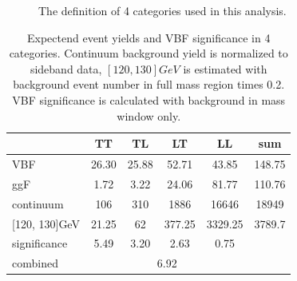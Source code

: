 \begin{figure}[htbp]
  \centering
  \hfill
  \caption{The definition of 4 categories used in this analysis. }
  \label{fig:catedef}
\end{figure}

\begin{table}[htbp]
\centering
\begin{tabular}{|l|c|c|c|c|c|}
\hline
                  & TT    & TL     & LT      & LL       &  sum    \\ \hline
VBF               & 26.30 & 25.88  & 52.71   & 43.85    &  148.75 \\ \hline
ggF               & 1.72  & 3.22   & 24.06   & 81.77    &  110.76 \\ \hline
continuum         & 106   & 310    & 1886    & 16646    &  18949  \\ \hline
{[}120, 130{]}GeV & 21.25 & 62     & 377.25  & 3329.25  &  3789.7 \\ \hline
significance      & 5.49  & 3.20   & 2.63    & 0.75     &   \\ \hline
combined          & \multicolumn{4}{c|}{6.92}           &   \\ \hline
\end{tabular}
\label{tab:sigmaInCate}
\caption{Expectend event yields and VBF significance in 4 categories. Continuum background yield is normalized to sideband data, $[120, 130]GeV$ is estimated with background event number in full mass region times 0.2. VBF significance is calculated with background in mass window only.}
\end{table}



